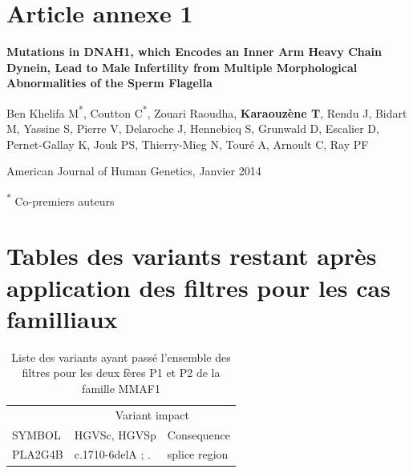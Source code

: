 \documentclass[12pt,a4paper,twoside]{ugathesis}
\theoremstyle{definition}
\theoremstyle{definition}
\theoremstyle{definition}
\theoremstyle{remark}
\begin{document}
\appendix

\hypertarget{dnah12014}{\chapter{Article annexe 1}\label{dnah12014}}

\textbf{Mutations in DNAH1, which Encodes an Inner Arm Heavy Chain
Dynein, Lead to Male Infertility from Multiple Morphological
Abnormalities of the Sperm Flagella}

Ben Khelifa M\textsuperscript{*}, Coutton C\textsuperscript{*}, Zouari
Raoudha, \textbf{Karaouzène T}, Rendu J, Bidart M, Yassine S, Pierre V,
Delaroche J, Hennebicq S, Grunwald D, Escalier D, Pernet-Gallay K, Jouk
PS, Thierry-Mieg N, Touré A, Arnoult C, Ray PF

American Journal of Human Genetics, Janvier 2014

\textsuperscript{*} Co-premiers auteurs

\newpage



\newpage

\chapter{Tables des variants restant après application des filtres pour
les cas
familliaux}\label{tables-des-variants-restant-apres-application-des-filtres-pour-les-cas-familliaux}

\begin{longtable}[t]{lll}
\caption{\label{tab:tabmmaf1}Liste des variants ayant passé l'ensemble des filtres pour les deux fères P1 et P2 de la famille MMAF1}\\
\toprule
\multicolumn{1}{c}{ } & \multicolumn{2}{c}{Variant impact} \\
\cmidrule(l{2pt}r{2pt}){2-3}
SYMBOL & HGVSc, HGVSp & Consequence\\
\midrule
PLA2G4B & c.1710-6delA ; . & splice region\\
\bottomrule
\end{longtable}
\end{document}
